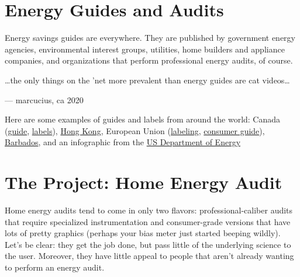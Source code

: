 \documentclass[]{tufte-book}
\begin{document}
\hypertarget{energy-guides-and-audits}{%
\section{Energy Guides and Audits}\label{energy-guides-and-audits}}

Energy savings guides are everywhere. They are published by government energy agencies, environmental interest groups, utilities, home builders and appliance companies, and organizations that perform professional energy audits, of course.

\ldots the only things on the 'net more prevalent
than energy guides are cat videos\ldots{}

--- marcucius, ca 2020

Here are some examples of guides and labels from around the world: Canada (\href{https://www.nrcan.gc.ca/energy-efficiency/energy-efficiency-homes/make-your-home-more-energy-efficient/20550}{guide}, \href{https://www.nrcan.gc.ca/energy-efficiency/energy-efficiency-products/product-information/windows-doors-skylights/sample-labels-windows-doors-and-skylights/13958}{labels}),
\href{https://www.clp.com.hk/en/my-home-site/energy-saving-ideas-site/understanding-energy-labels-site/PublishingImages/logo_EnergyLabel_detail.jpg}{Hong Kong}, European Union (\href{https://ec.europa.eu/info/energy-climate-change-environment/standards-tools-and-labels/products-labelling-rules-and-requirements/energy-label-and-ecodesign/about_en}{labeling}, \href{figures/MJ0117061ENN.en.pdf}{consumer guide}), \href{figures/barbadoslabel.png}{Barbados}, and an infographic from the \href{https://www.energy.gov/sites/prod/files/styles/borealis_article_hero_respondxl2/public/energysaver2017_HomeEnergyAudits.png?itok=JTSoNyts}{US Department of Energy}

\hypertarget{the-project-home-energy-audit}{%
\section{The Project: Home Energy Audit}\label{the-project-home-energy-audit}}

Home energy audits tend to come in only two flavors: professional-caliber audits that require specialized instrumentation and consumer-grade versions that have lots of pretty graphics (perhaps your bias meter just started beeping wildly). Let's be clear: they get the job done, but pass little of the underlying science to the user. Moreover, they have little appeal to people that aren't already wanting to perform an energy audit.
\end{document}
